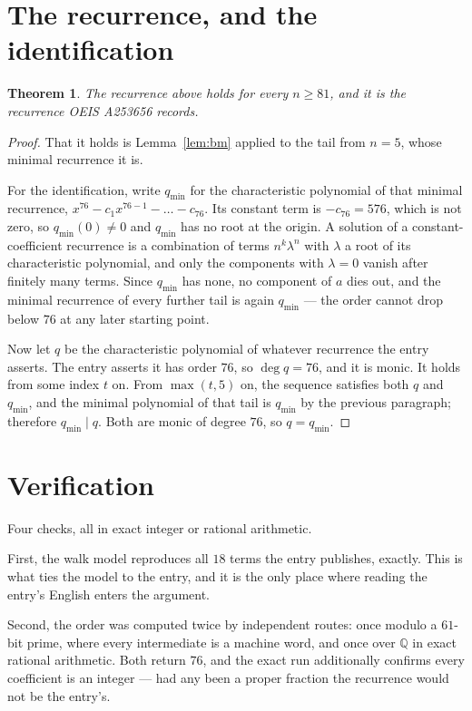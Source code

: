 \documentclass[11pt,a4paper]{article}
\theoremstyle{plain}
\newtheorem{theorem}{Theorem}
\theoremstyle{definition}
\begin{document}
\section{The recurrence, and the identification}

\begin{theorem}
The recurrence above holds for every $n\ge81$, and it is the recurrence OEIS A253656 records.
\end{theorem}

\begin{proof}
That it holds is Lemma~\ref{lem:bm} applied to the tail from $n=5$, whose minimal
recurrence it is.

For the identification, write $q_{\min}$ for the characteristic polynomial of that minimal
recurrence, $x^{76}-c_1x^{76-1}-\dots-c_{76}$. Its constant term is
$-c_{76}=576$, which is not zero, so $q_{\min}(0)\neq0$ and $q_{\min}$ has no
root at the origin. A solution of a constant-coefficient recurrence is a combination of terms
$n^{k}\lambda^{n}$ with $\lambda$ a root of its characteristic polynomial, and only the
components with $\lambda=0$ vanish after finitely many terms. Since $q_{\min}$ has none, no
component of $a$ dies out, and the minimal recurrence of every further tail is again
$q_{\min}$ --- the order cannot drop below $76$ at any later starting point.

Now let $q$ be the characteristic polynomial of whatever recurrence the entry asserts. The
entry asserts it has order $76$, so $\deg q=76$, and it is monic. It holds from some
index $t$ on. From $\max(t,5)$ on, the sequence satisfies both $q$ and $q_{\min}$, and
the minimal polynomial of that tail is $q_{\min}$ by the previous paragraph; therefore
$q_{\min}\mid q$. Both are monic of degree $76$, so $q=q_{\min}$.
\end{proof}

\section{Verification}

Four checks, all in exact integer or rational arithmetic.

First, the walk model reproduces all $18$ terms the entry publishes, exactly. This is
what ties the model to the entry, and it is the only place where reading the entry's English
enters the argument.

Second, the order was computed twice by independent routes: once modulo a $61$-bit prime, where
every intermediate is a machine word, and once over $\mathbb{Q}$ in exact rational arithmetic.
Both return $76$, and the exact run additionally confirms every coefficient is an integer
--- had any been a proper fraction the recurrence would not be the entry's.
\end{document}
